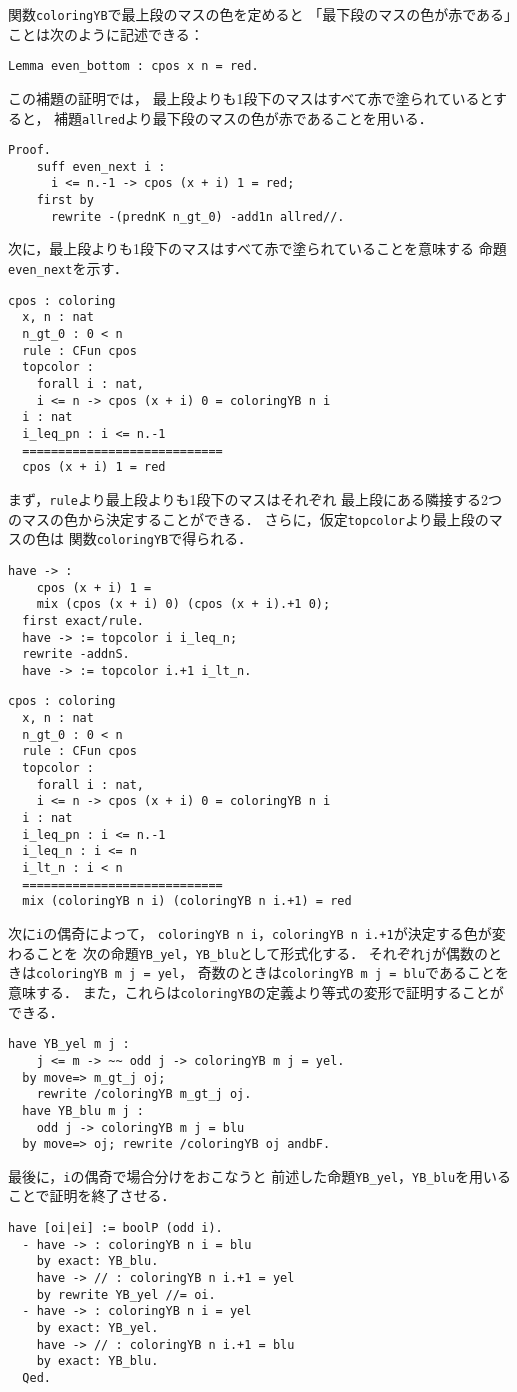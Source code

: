 関数{\tt{coloringYB}}で最上段のマスの色を定めると
「最下段のマスの色が赤である」ことは次のように記述できる：
\begin{lstlisting}[language=Coq]
  Lemma even_bottom : cpos x n = red.
\end{lstlisting}
この補題の証明では，
最上段よりも1段下のマスはすべて赤で塗られているとすると，
補題{\tt{allred}}より最下段のマスの色が赤であることを用いる．
\begin{lstlisting}[language=Coq]
  Proof.
    suff even_next i :
      i <= n.-1 -> cpos (x + i) 1 = red;
    first by
      rewrite -(prednK n_gt_0) -add1n allred//.
\end{lstlisting}
次に，最上段よりも1段下のマスはすべて赤で塗られていることを意味する
命題{\tt{even\_next}}を示す．
\begin{lstlisting}[language=Coq]
  cpos : coloring
  x, n : nat
  n_gt_0 : 0 < n
  rule : CFun cpos
  topcolor :
    forall i : nat,
    i <= n -> cpos (x + i) 0 = coloringYB n i
  i : nat
  i_leq_pn : i <= n.-1
  ============================
  cpos (x + i) 1 = red
\end{lstlisting}
まず，{\tt{rule}}より最上段よりも1段下のマスはそれぞれ
最上段にある隣接する2つのマスの色から決定することができる．
さらに，仮定{\tt{topcolor}}より最上段のマスの色は
関数{\tt{coloringYB}}で得られる．
\begin{lstlisting}[language=Coq]
  have -> :
    cpos (x + i) 1 =
    mix (cpos (x + i) 0) (cpos (x + i).+1 0);
  first exact/rule.
  have -> := topcolor i i_leq_n;
  rewrite -addnS.
  have -> := topcolor i.+1 i_lt_n.
\end{lstlisting}
\begin{lstlisting}[language=Coq]
  cpos : coloring
  x, n : nat
  n_gt_0 : 0 < n
  rule : CFun cpos
  topcolor :
    forall i : nat,
    i <= n -> cpos (x + i) 0 = coloringYB n i
  i : nat
  i_leq_pn : i <= n.-1
  i_leq_n : i <= n
  i_lt_n : i < n
  ============================
  mix (coloringYB n i) (coloringYB n i.+1) = red
\end{lstlisting}
次に{\tt{i}}の偶奇によって，
{\tt{coloringYB n i}}，{\tt{coloringYB n i.+1}}が決定する色が変わることを
次の命題{\tt{YB\_yel}}，{\tt{YB\_blu}}として形式化する．
それぞれ{\tt{j}}が偶数のときは{\tt{coloringYB m j = yel}}，
奇数のときは{\tt{coloringYB m j = blu}}であることを意味する．
また，これらは{\tt{coloringYB}}の定義より等式の変形で証明することができる．
\begin{lstlisting}[language=Coq]
  have YB_yel m j :
    j <= m -> ~~ odd j -> coloringYB m j = yel.
  by move=> m_gt_j oj;
    rewrite /coloringYB m_gt_j oj.
  have YB_blu m j :
    odd j -> coloringYB m j = blu
  by move=> oj; rewrite /coloringYB oj andbF.
\end{lstlisting}
最後に，{\tt{i}}の偶奇で場合分けをおこなうと
前述した命題{\tt{YB\_yel}}，{\tt{YB\_blu}}を用いることで証明を終了させる．
\begin{lstlisting}[language=Coq]
  have [oi|ei] := boolP (odd i).
  - have -> : coloringYB n i = blu
    by exact: YB_blu.
    have -> // : coloringYB n i.+1 = yel
    by rewrite YB_yel //= oi.
  - have -> : coloringYB n i = yel
    by exact: YB_yel.
    have -> // : coloringYB n i.+1 = blu
    by exact: YB_blu.
  Qed.
\end{lstlisting}


